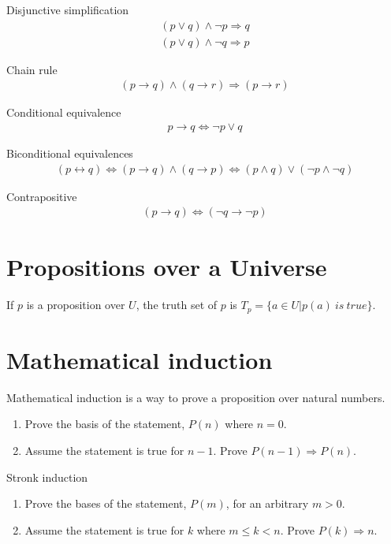 \documentclass{article}
\begin{document}
Disjunctive simplification
\begin{gather*}
    (p \lor q) \land \neg p \Rightarrow q \\
    (p \lor q) \land \neg q \Rightarrow p
\end{gather*}

Chain rule
\begin{gather*}
    (p \rightarrow q) \land (q \rightarrow r) \Rightarrow (p \rightarrow r)
\end{gather*}

Conditional equivalence
\begin{gather*}
    p \rightarrow q \Leftrightarrow \neg p \lor q
\end{gather*}

Biconditional equivalences
\begin{gather*}
    (p \leftrightarrow q) \Leftrightarrow (p \rightarrow q) \land (q \rightarrow p) \Leftrightarrow (p \land q) \lor (\neg p \land \neg q)
\end{gather*}

Contrapositive
\begin{gather*}
    (p \rightarrow q) \Leftrightarrow (\neg q \rightarrow \neg p)
\end{gather*}

\section{Propositions over a Universe}

If $p$ is a proposition over $U$, the truth set of $p$ is $T_p = \{a \in U | p(a)\ is\ true\}$.

\section{Mathematical induction}

Mathematical induction is a way to prove a proposition over natural numbers.

\begin{enumerate}
    \item Prove the basis of the statement, $P(n)$ where $n = 0$.
    \item Assume the statement is true for $n - 1$. Prove $P(n-1) \Rightarrow P(n)$.
\end{enumerate}

Stronk induction

\begin{enumerate}
    \item Prove the bases of the statement, $P(m)$, for an arbitrary $m > 0$.
    \item Assume the statement is true for $k$ where $m \leq k < n$. Prove $P(k) \Rightarrow n$.
\end{enumerate}
\end{document}
